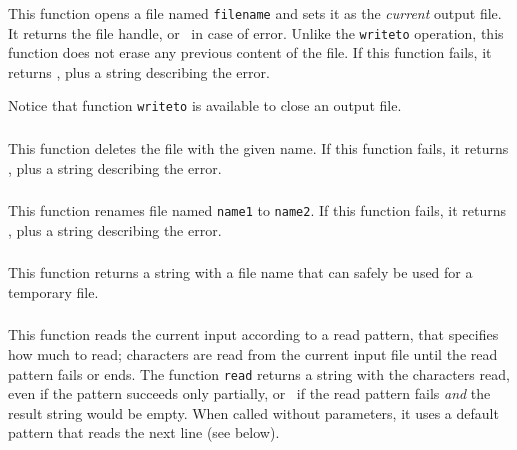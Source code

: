 \subsubsection*{}

This function opens a file named \verb'filename' and sets it as the
{\em current\/} output file.
It returns the file handle,
or \nil\ in case of error.
Unlike the \verb'writeto' operation,
this function does not erase any previous content of the file.
If this function fails, it returns \nil,
plus a string describing the error.

Notice that function \verb|writeto| is available to close an output file.

\subsubsection*{}

This function deletes the file with the given name.
If this function fails, it returns \nil,
plus a string describing the error.

\subsubsection*{}

This function renames file named \verb'name1' to \verb'name2'.
If this function fails, it returns \nil,
plus a string describing the error.

\subsubsection*{}

This function returns a string with a file name that can safely
be used for a temporary file.

\subsubsection*{}

This function reads the current input
according to a read pattern, that specifies how much to read;
characters are read from the current input file until
the read pattern fails or ends.
The function \verb|read| returns a string with the characters read,
even if the pattern succeeds only partially,
or \nil\ if the read pattern fails {\em and\/}
the result string would be empty.
When called without parameters,
it uses a default pattern that reads the next line
(see below).

